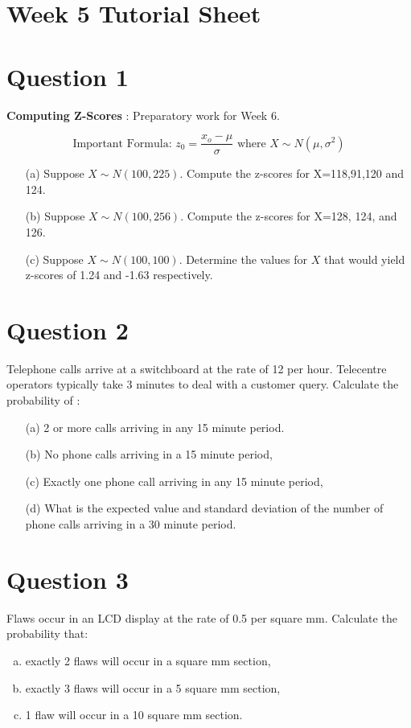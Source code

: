 \documentclass[]{article}
\begin{document}
\section*{Week 5 Tutorial Sheet}

\section*{Question 1}
\noindent \textbf{Computing Z-Scores} : Preparatory work for Week 6.


\[\mbox{Important Formula: } z_0 =  \frac{x_o - \mu }{ \sigma}  \mbox{ where } X \sim N(\mu,\sigma^2) \]
\begin{itemize}
\item[(a)] Suppose $X \sim N(100,225)$. Compute the z-scores for X=118,91,120 and 124.
\item[(b)] Suppose $X \sim N(100,256)$. Compute the z-scores for X=128, 124, and 126.
\item[(c)] Suppose $X \sim N(100,100)$. Determine the values for $X$ that would yield z-scores of 1.24 and -1.63 respectively.
\end{itemize}


\section*{Question 2}
Telephone calls arrive at a switchboard at the rate of 12 per hour.  Telecentre operators typically take 3 minutes to deal with a customer query.
Calculate the probability of :

\begin{itemize}
\item[(a)] 2 or more calls arriving in any 15 minute period.
\item[(b)] No phone calls arriving in a 15 minute period,
\item[(c)] Exactly one phone call arriving in any 15 minute period,
\item[(d)] What is the expected value and standard deviation of the number
of phone calls arriving in a 30 minute period.
\end{itemize}


\section*{Question 3}
Flaws occur in an LCD display at the rate of 0.5 per square mm. Calculate the probability
that:
\begin{enumerate}[(a)]
    \item exactly 2 flaws will occur in a square mm section,
\item exactly 3 flaws will occur in a 5 square mm section,
\item 1 flaw will occur in a 10 square mm section.
\end{enumerate}
\end{document}
